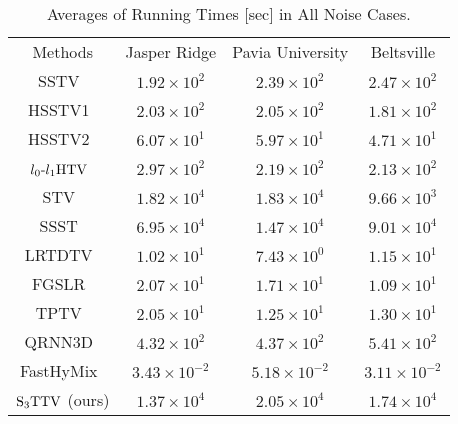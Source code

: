 \begin{table}[!t]
	\begin{center}
		\caption{Averages of Running Times [sec] in All Noise Cases.}
		\label{tab:Runtime}
			\begin{tabular}{c ccc}
				\toprule
                Methods & Jasper Ridge & Pavia University & Beltsville \\
				\cmidrule(r){1-1}
				\cmidrule(l){2-4}
				SSTV~\cite{Aggarwal2016SSTV}   & $1.92 \times 10^{2}$ & $2.39 \times 10^{2}$ & $2.47 \times 10^{2}$ \\
                HSSTV1~\cite{Takeyama2020HSSTV} & $2.03 \times 10^{2}$ & $2.05 \times 10^{2}$ & $1.81 \times 10^{2}$ \\
				HSSTV2~\cite{Takeyama2020HSSTV} & $6.07 \times 10^{1}$ & $5.97 \times 10^{1}$ & $4.71 \times 10^{1}$ \\
                ${l_{0}\text{-}l_{1}\text{HTV}}$~\cite{Wang2021l0l1HTV} & $2.97 \times 10^{2}$ & $2.19 \times 10^{2}$ & $2.13 \times 10^{2}$ \\
                STV~\cite{Lefkimmiatis2015STV} & $1.82 \times 10^{4}$ & $1.83 \times 10^{4}$ & $9.66 \times 10^{3}$ \\
                SSST~\cite{Kurihara2017SSST} & $6.95 \times 10^{4}$ & $1.47 \times 10^{4}$ & $9.01 \times 10^{4}$ \\
                LRTDTV~\cite{Wang2018LRTDTV} & $1.02 \times 10^{1}$ & $7.43 \times 10^{0}$ & $1.15 \times 10^{1}$ \\
                FGSLR~\cite{Chen2022FGSLR} & $2.07 \times 10^{1}$ & $1.71 \times 10^{1}$ & $1.09 \times 10^{1}$ \\
                TPTV~\cite{Chen2023TPTV} & $2.05 \times 10^{1}$ & $1.25 \times 10^{1}$ & $1.30 \times 10^{1}$ \\
                QRNN3D~\cite{Wei2021QRNN3D} & $4.32 \times 10^{2}$ & $4.37 \times 10^{2}$ & $5.41 \times 10^{2}$ \\
                FastHyMix~\cite{Zhuang2023FastHyMix} & $3.43 \times 10^{-2}$ & $5.18 \times 10^{-2}$ & $3.11 \times 10^{-2}$ \\
                ${\text{S}_{3} \text{TTV}}$ (ours) & $1.37 \times 10^{4}$ & $2.05 \times 10^{4}$ & $1.74 \times 10^{4}$ \\
				\bottomrule
			\end{tabular}
	\end{center}
	\vspace{-3mm}
\end{table}